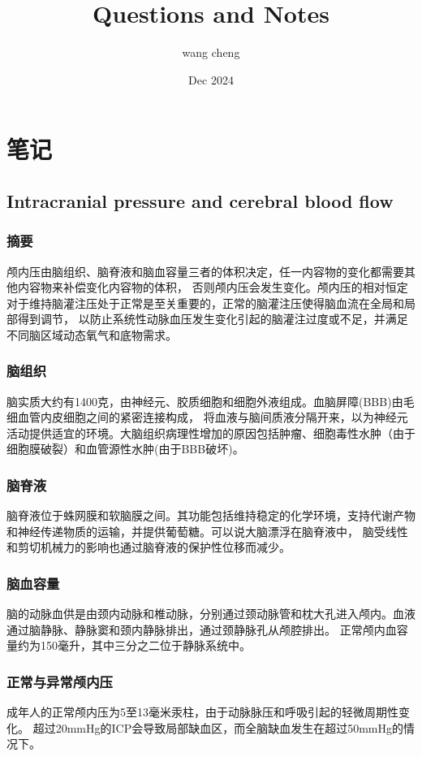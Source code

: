 \documentclass[titlepage,12pt]{article}
\title{Questions and Notes}
\author{wang cheng}
\date{Dec 2024}
\begin{document}
\maketitle

\section{笔记}
\subsection{Intracranial pressure and  cerebral blood flow}
\subsubsection{摘要}
颅内压由脑组织、脑脊液和脑血容量三者的体积决定，任一内容物的变化都需要其他内容物来补偿变化内容物的体积，
否则颅内压会发生变化。颅内压的相对恒定对于维持脑灌注压处于正常是至关重要的，正常的脑灌注压使得脑血流在全局和局部得到调节，
以防止系统性动脉血压发生变化引起的脑灌注过度或不足，并满足不同脑区域动态氧气和底物需求。
\subsubsection{脑组织}
脑实质大约有1400克，由神经元、胶质细胞和细胞外液组成。血脑屏障(BBB)由毛细血管内皮细胞之间的紧密连接构成，
将血液与脑间质液分隔开来，以为神经元活动提供适宜的环境。大脑组织病理性增加的原因包括肿瘤、细胞毒性水肿（由于细胞膜破裂）和血管源性水肿(由于BBB破坏)。
\subsubsection{脑脊液}
脑脊液位于蛛网膜和软脑膜之间。其功能包括维持稳定的化学环境，支持代谢产物和神经传递物质的运输，并提供葡萄糖。可以说大脑漂浮在脑脊液中，
脑受线性和剪切机械力的影响也通过脑脊液的保护性位移而减少。
\subsubsection{脑血容量}
脑的动脉血供是由颈内动脉和椎动脉，分别通过颈动脉管和枕大孔进入颅内。血液通过脑静脉、静脉窦和颈内静脉排出，通过颈静脉孔从颅腔排出。
正常颅内血容量约为150毫升，其中三分之二位于静脉系统中。
\subsubsection{正常与异常颅内压}
成年人的正常颅内压为5至13毫米汞柱，由于动脉脉压和呼吸引起的轻微周期性变化。
超过20mmHg的ICP会导致局部缺血区，而全脑缺血发生在超过50mmHg的情况下。
\end{document}
